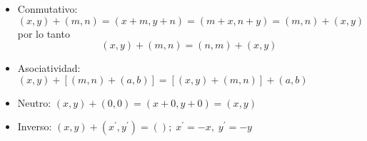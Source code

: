 \begin{itemize}
    \item Conmutativo: $(x,y)+(m,n) = (x+m,y+n) = (m+x,n+y)=(m,n)+(x,y)$ por lo tanto $$(x,y)+(m,n)=(n,m)+(x,y)$$
    \item Asociatividad: $(x,y)+\left[(m,n)+(a,b)\right]=\left[(x,y)+(m,n)\right]+(a,b)$
    \item Neutro: $(x,y)+(0,0) = (x+0,y+0)=(x,y)$
    \item Inverso: $(x,y)+(x^{'},y^{'})=();\; x^{'}=-x,\; y^{'}=-y$ 
    \end{itemize}


